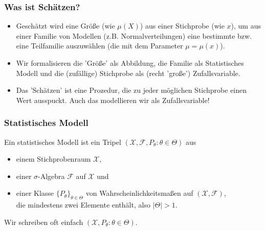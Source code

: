 \begin{frame}
  \frametitle{Was ist Schätzen?}

  \begin{itemize}[<+->]
  \item  Geschätzt wird eine Größe (wie $\mu(X)$) aus einer Stichprobe (wie $x$), um aus einer Familie von Modellen (z.B. Normalverteilungen) eine bestimmte bzw. eine Teilfamilie auszuwählen (die mit dem Parameter $\mu = \mu(x)$).
  \item Wir formalisieren die 'Größe' als Abbildung, die Familie als \alert{Statistisches Modell} und die (zufällige) Stichprobe als (recht 'große') Zufallsvariable.
  \item  Das 'Schätzen' ist eine Prozedur, die zu jeder möglichen Stichprobe einen Wert ausspuckt. Auch das modellieren wir als Zufallsvariable!
  \end{itemize}
\end{frame}  

  \begin{frame}
    \frametitle{Statistisches Modell}
    \begin{definition}
      Ein statistisches Modell ist ein Tripel $(\mathcal{X}, \mathcal{F}, P_\theta : \theta \in \Theta)$
      aus
      \begin{itemize}
        \item
          einem Stichprobenraum $\mathcal{X}$,
        \item einer $\sigma$-Algebra $\mathcal{F}$ auf $\mathcal{X}$ und
        \item einer Klasse $\{P_\theta\}_{\theta \in \Theta}$ von Wahrscheinlichkeitsmaßen auf $(\mathcal{X}, \mathcal{F})$,\\ die mindestens zwei Elemente enthält, also $|\Theta| > 1$.
        \end{itemize}
        Wir schreiben oft einfach $(\mathcal{X}, P_\theta : \theta \in \Theta)$.

    \end{definition}
  \end{frame}

